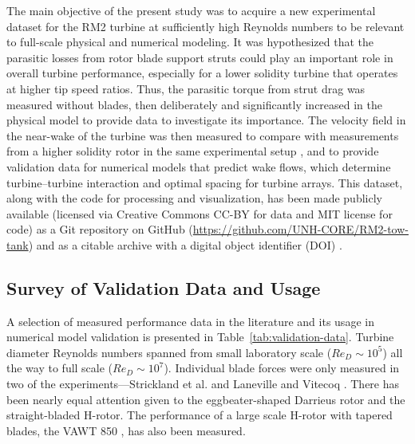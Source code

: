 The main objective of the present study was to acquire a new experimental
dataset for the RM2 turbine at sufficiently high Reynolds numbers to be relevant
to full-scale physical and numerical modeling. It was hypothesized that the
parasitic losses from rotor blade support struts could play an important role in
overall turbine performance, especially for a lower solidity turbine that
operates at higher tip speed ratios. Thus, the parasitic torque from strut drag
was measured without blades, then deliberately and significantly increased in
the physical model to provide data to investigate its importance. The velocity
field in the near-wake of the turbine was then measured to compare with
measurements from a higher solidity rotor in the same experimental setup
\cite{Bachant2015-JoT}, and to provide validation data for numerical models that
predict wake flows, which determine turbine--turbine interaction and optimal
spacing for turbine arrays. This dataset, along with the code for processing and
visualization, has been made publicly available (licensed via Creative Commons
CC-BY for data and MIT license for code) as a Git repository on GitHub
(\url{https://github.com/UNH-CORE/RM2-tow-tank}) and as a citable archive with a
digital object identifier (DOI) \cite{Bachant2016-RM2-data}.


\subsection{Survey of Validation Data and Usage}

A selection of measured performance data in the literature and its usage in
numerical model validation is presented in Table~\ref{tab:validation-data}.
Turbine diameter Reynolds numbers spanned from small laboratory scale ($Re_D
\sim 10^5$) all the way to full scale ($Re_D \sim 10^7$). Individual blade
forces were only measured in two of the experiments---Strickland et al.
\cite{Strickland1981} and Laneville and Vitecoq \cite{Laneville1986}. There has
been nearly equal attention given to the eggbeater-shaped Darrieus rotor and the
straight-bladed H-rotor. The performance of a large scale H-rotor with tapered
blades, the VAWT 850 \cite{Mays1990}, has also been measured.

